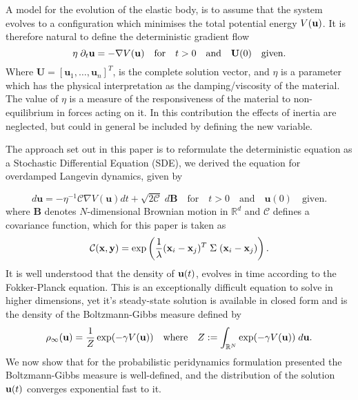 \documentclass{article}
\begin{document}
\smallskip
A model for the evolution of the elastic body, is to assume that the system evolves to a configuration which minimises the total potential energy $V({\bf u})$. It is therefore natural to define the deterministic gradient flow
$$
\eta \;\partial_t \textbf{u} = -\nabla V ({\bf u}) \quad \mbox{for} \quad t > 0 \quad \mbox{and} \quad \textbf{U}(0) \quad \mbox{given}.
$$
Where $\textbf{U} = [\textbf{u}_1,\ldots,\textbf{u}_n]^T$, is the complete solution vector, and $\eta$ is a parameter which has the physical interpretation as the damping/viscosity of the material. The value of $\eta$ is a measure of the responsiveness of the material to non-equilibrium in forces acting on it. In this contribution the effects of inertia are neglected, but could in general be included by defining the new variable.

\smallskip\noindent
The approach set out in this paper is to reformulate the deterministic equation as a Stochastic Differential Equation (SDE), we derived the equation for overdamped Langevin dynamics, given by

\smallskip
\begin{equation}\label{eqn:sde}
d\textbf{u} = -\eta^{-1}\mathcal{C}\nabla V (\textbf{u})dt  + \sqrt{2\mathcal C}\;d\textbf{B} \quad \mbox{for} \quad t > 0 \quad \mbox{and} \quad \textbf{u}(0) \quad \mbox{given}.
\end{equation}
\smallskip\noindent
where $\textbf{B}$ denotes $N$-dimensional Brownian motion in $\mathbb R^d$ and $\mathcal C$ defines a covariance function, which for this paper is taken as
\begin{equation}
\mathcal C({\bf x}, {\bf y}) = \exp \left( \frac{1}{\lambda}({\bf x}_i - {\bf x}_j)^T  \;\Sigma \;({\bf x}_i - {\bf x}_j)\right).
\end{equation}
It is well understood that the density of ${\bf u}(t)$, evolves in time according to the Fokker-Planck equation.  This is an exceptionally difficult equation to solve in higher dimensions, yet it's steady-state solution is available in closed form and is the density of the Boltzmann-Gibbs measure defined by
\begin{equation}\label{eqn:BoltzmannGibbs}
\rho_\infty({\bf u}) = \frac{1}{Z}\exp(-\gamma V({\bf u})) \quad \mbox{where} \quad Z:= \int_{\mathbb R^N} \exp(-\gamma V({\bf u}))\;d{\bf u}.
\end{equation}
 We now show that for the probabilistic peridynamics formulation presented the Boltzmann-Gibbs measure is well-defined, and the distribution of the solution ${\bf u}(t)$ converges exponential fast to it.
 
\end{document}
